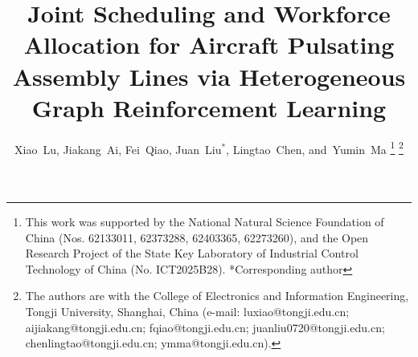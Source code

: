 \documentclass[journal,10pt]{IEEEtran}
\begin{document}
\title{Joint Scheduling and Workforce Allocation for Aircraft Pulsating Assembly Lines via Heterogeneous Graph Reinforcement Learning}

\author{Xiao~Lu,
        Jiakang~Ai,
        Fei~Qiao,
        Juan~Liu$^*$,
        Lingtao~Chen,
        and~Yumin~Ma%
\thanks{This work was supported by the National Natural Science Foundation of China (Nos. 62133011, 62373288, 62403365, 62273260), and the Open Research Project of the State Key Laboratory of Industrial Control Technology of China (No. ICT2025B28). *Corresponding author}%
\thanks{The authors are with the College of Electronics and Information Engineering, Tongji University, Shanghai, China (e-mail: luxiao@tongji.edu.cn; aijiakang@tongji.edu.cn; fqiao@tongji.edu.cn; juanliu0720@tongji.edu.cn; chenlingtao@tongji.edu.cn; ymma@tongji.edu.cn).}%
}


\maketitle
\end{document}
